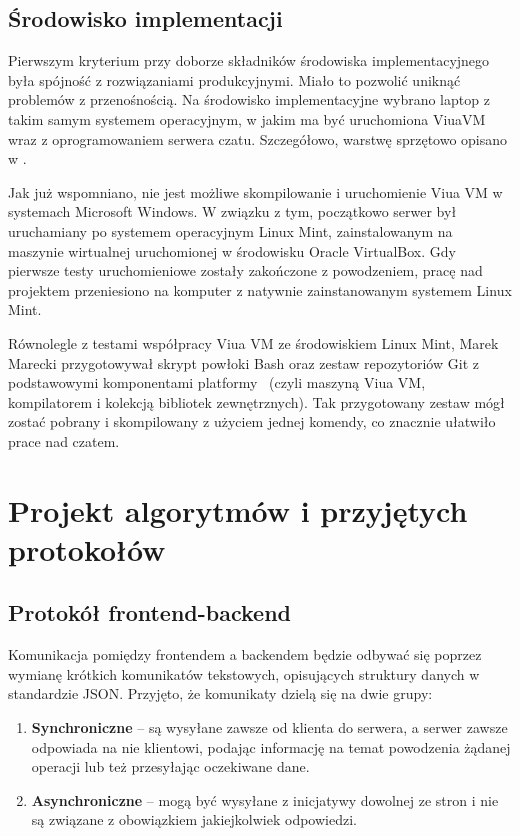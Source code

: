 \subsection{Środowisko implementacji}
Pierwszym kryterium przy doborze składników środowiska implementacyjnego była
spójność z rozwiązaniami produkcyjnymi. Miało to pozwolić uniknąć problemów
z przenośnością. Na środowisko implementacyjne wybrano laptop z takim samym
systemem operacyjnym, w jakim ma być uruchomiona ViuaVM wraz z oprogramowaniem
serwera czatu. Szczegółowo, warstwę sprzętowo opisano w .

Jak już wspomniano, nie jest możliwe skompilowanie i uruchomienie Viua
VM w systemach Microsoft Windows. W związku z tym, początkowo serwer był
uruchamiany po systemem operacyjnym Linux Mint, zainstalowanym na maszynie
wirtualnej uruchomionej w środowisku Oracle VirtualBox. Gdy pierwsze testy
uruchomieniowe zostały zakończone z powodzeniem, pracę nad projektem
przeniesiono na komputer z natywnie zainstanowanym systemem Linux Mint.

Równolegle z testami współpracy Viua VM ze środowiskiem Linux Mint, Marek
Marecki przygotowywał skrypt powłoki Bash oraz zestaw repozytoriów Git z
podstawowymi komponentami platformy \ViuAct\ (czyli maszyną Viua VM, kompilatorem
\ViuAct i kolekcją bibliotek zewnętrznych). Tak przygotowany zestaw mógł zostać
pobrany i skompilowany z użyciem jednej komendy, co znacznie ułatwiło prace
nad czatem.

\section{Projekt algorytmów i przyjętych protokołów}

\subsection{Protokół frontend-backend}
Komunikacja pomiędzy frontendem a backendem będzie odbywać się poprzez wymianę
krótkich komunikatów tekstowych, opisujących struktury danych w standardzie
JSON. Przyjęto, że komunikaty dzielą się na dwie grupy:

\begin{enumerate}
	\item \textbf{Synchroniczne} -- są wysyłane zawsze od klienta do serwera, a
	serwer zawsze odpowiada na nie klientowi, podając informację na temat
	powodzenia żądanej operacji lub też przesyłając oczekiwane dane.

	\item \textbf{Asynchroniczne} -- mogą być wysyłane z inicjatywy dowolnej ze
	stron i nie są związane z obowiązkiem jakiejkolwiek odpowiedzi.
\end{enumerate}

